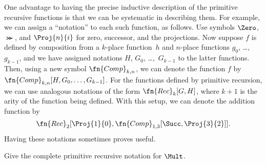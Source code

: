 \documentclass[../../../include/open-logic-section]{subfiles}
\begin{document}

One advantage to having the precise inductive description of the primitive
recursive functions is that we can be systematic in describing them.
For example, we can assign a ``notation'' to each such function, as
follows. Use symbols $\Zero$, $\Succ$, and $\Proj{n}{i}$ for zero,
successor, and the projections. Now suppose $f$ is defined by
composition from a $k$-place function~$h$ and $n$-place functions $g_0$,
\dots,~$g_{k-1}$, and we have assigned notations $H$, $G_0$,
\dots,~$G_{k-1}$ to the latter functions. Then, using a new symbol
$\fn{Comp}_{k,n}$, we can denote the function $f$ by
$\fn{Comp}_{k,n}[H,G_0,\dots,G_{k-1}]$. For the functions defined by
primitive recursion, we can use analogous notations of the form
$\fn{Rec}_k[G,H]$, where $k+1$ is the arity of the function being
defined. With this setup, we can denote the addition function by
\[
\fn{Rec}_2[\Proj{1}{0},\fn{Comp}_{1,3}[\Succ,\Proj{3}{2}]].
\]
Having these notations sometimes proves useful.

\begin{prob}
  Give the complete primitive recursive notation for $\Mult$.
\end{prob}
\end{document}
